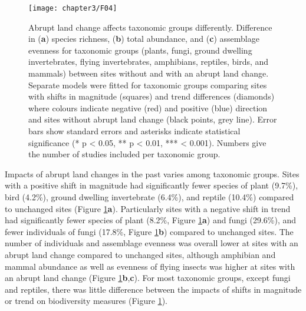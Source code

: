 \begin{figure}[!htb]
\centering
\texttt{[image: chapter3/F04]}
\caption{Abrupt land change affects taxonomic groups differently. Difference in (\textbf{a}) species richness, (\textbf{b}) total abundance, and (\textbf{c}) assemblage evenness for taxonomic groups (plants, fungi, ground dwelling invertebrates, flying invertebrates, amphibians, reptiles, birds, and mammals) between sites without and with an abrupt land change. Separate models were fitted for taxonomic groups comparing sites with shifts in magnitude (squares) and trend differences (diamonds) where colours indicate negative (red) and positive (blue) direction and sites without abrupt land change (black points, grey line). Error bars show standard errors and asterisks indicate statistical significance (* p < 0.05, ** p < 0.01, *** < 0.001). Numbers give the number of studies included per taxonomic group.}
\label{F03_04}
\end{figure}

Impacts of abrupt land changes in the past varies among taxonomic groups. Sites with a positive shift in magnitude had significantly fewer species of plant (9.7\%), bird (4.2\%), ground dwelling invertebrate (6.4\%), and reptile (10.4\%) compared to unchanged sites (Figure \ref{F03_04}\textbf{a}). Particularly sites with a negative shift in trend had significantly fewer species of plant (8.2\%, Figure \ref{F03_04}\textbf{a}) and fungi (29.6\%), and fewer individuals of fungi (17.8\%, Figure \ref{F03_04}\textbf{b}) compared to unchanged sites. The number of individuals and assemblage evenness was overall lower at sites with an abrupt land change compared to unchanged sites, although amphibian and mammal abundance as well as evenness of flying insects was higher at sites with an abrupt land change (Figure \ref{F03_04}\textbf{b},\textbf{c}). For most taxonomic groups, except fungi and reptiles, there was little difference between the impacts of shifts in magnitude or trend on biodiversity measures (Figure \ref{F03_04}).

